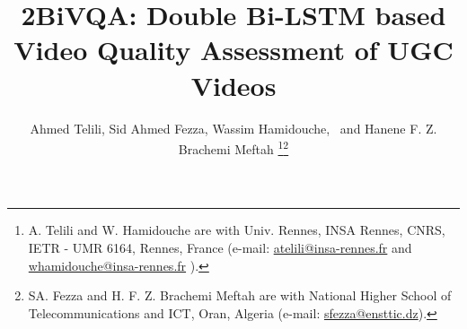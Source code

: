 \documentclass[journal]{IEEEtran}
\begin{document}
\title{2BiVQA: Double Bi-LSTM based Video Quality Assessment of UGC Videos}

\author{Ahmed Telili, Sid Ahmed Fezza, Wassim Hamidouche,~ and Hanene F. Z. Brachemi Meftah
\thanks{A. Telili and W. Hamidouche  are with Univ. Rennes, INSA Rennes, CNRS, IETR - UMR 6164, Rennes, France (e-mail: \href{mailto:atelili@insa-rennes.fr}{atelili@insa-rennes.fr} and \href{mailto:whamidouche@insa-rennes.fr}{whamidouche@insa-rennes.fr} ).}\thanks{SA. Fezza and H. F. Z. Brachemi Meftah are with National Higher School of Telecommunications and ICT, Oran, Algeria (e-mail: \href{mailto:sfezza@ensttic.dz}{sfezza@ensttic.dz}).}}





\maketitle
\end{document}
